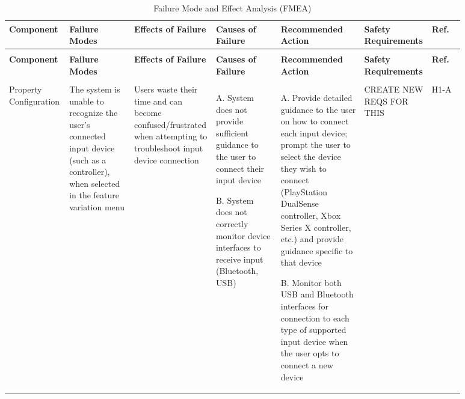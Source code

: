 \small
\renewcommand{\arraystretch}{1.3}

\begin{longtable}{|>{\raggedright\arraybackslash}p{0.13\linewidth}|>{\raggedright\arraybackslash}p{0.14\linewidth}|>{\raggedright\arraybackslash}p{0.14\linewidth}|>{\raggedright\arraybackslash}p{0.14\linewidth}|>{\raggedright\arraybackslash}p{0.18\linewidth}|>{\raggedright\arraybackslash}p{0.08\linewidth}|>{\raggedright\arraybackslash}p{0.07\linewidth}|}
	
	\caption{Failure Mode and Effect Analysis (FMEA)}
	\label{tab:fmea}\\
	\hline
	
	\textbf{Component} &
	\textbf{Failure Modes} &
	\textbf{Effects of Failure} &
	\textbf{Causes of Failure} &
	\textbf{Recommended Action} &
	\textbf{Safety Requirements} &
	\textbf{Ref.} \\
	\hline
	\endfirsthead
	
	\multicolumn{7}{c}{Table \thetable\ -- Continued}\\
	\hline
	
	\textbf{Component} &
	\textbf{Failure Modes} &
	\textbf{Effects of Failure} &
	\textbf{Causes of Failure} &
	\textbf{Recommended Action} &
	\textbf{Safety Requirements} &
	\textbf{Ref.} \\
	\hline
	\endhead
	
	\hline
	\multicolumn{7}{r}{Continued on next page}\\
	\endfoot
	
	\hline
	\endlastfoot
	
	Property Configuration &
	The system is unable to recognize the user's connected input device (such 
	as a controller), when selected in the feature variation menu &
	Users waste their time and can become confused/frustrated when attempting 
	to troubleshoot input device connection &
	A. System does not provide sufficient guidance to the user to connect their 
	input device
	
	B. System does not correctly monitor device interfaces to receive input 
	(Bluetooth, USB) &
	A. Provide detailed guidance to the user on how to connect each input 
	device; prompt the user to select the device they wish to connect 
	(PlayStation DualSense controller, Xbox Series X controller, etc.) and 
	provide guidance specific to that device
	
	B. Monitor both USB and Bluetooth interfaces for connection to each type of 
	supported input device when the user opts to connect a new device &
	CREATE NEW REQS FOR THIS &
	H1-A \\
	\hline
	

\end{longtable}
